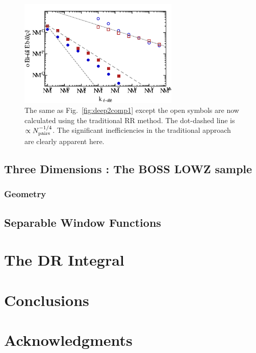 \documentclass[usenatbib]{mn2e}
\begin{document}
\begin{figure}
\includegraphics[width=3in]{plots/deep2rrcomp2}
\caption{The same as Fig.~\ref{fig:deep2comp1} except the open symbols are now
calculated using the traditional RR method. The dot-dashed line is $\propto
N_{\rm pairs}^{-1/4}$. The significant inefficiencies in the traditional
approach are clearly apparent here. }
\label{fig:deep2comp2}
\end{figure}

\lipsum[1-3]

\subsection{Three Dimensions : The BOSS LOWZ sample}

\lipsum[1-3]

\subsubsection{Geometry}

\lipsum[1-3]

\subsection{Separable Window Functions}
\label{sec:sep}

\lipsum[1-3]

\section{The DR Integral}
\label{sec:DR}

\lipsum[1-3]

\section{Conclusions}
\label{sec:conclude}

\lipsum[1-3]

\section{Acknowledgments}
\end{document}

